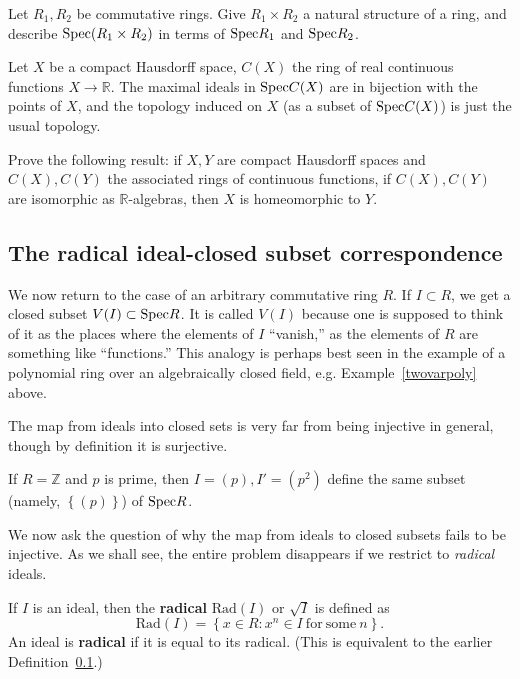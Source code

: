 \begin{exercise} 
Let $R_1, R_2$ be commutative rings. Give $R_1 \times R_2$ a natural structure
of a ring, and describe $\mathrm{Spec}( R_1 \times R_2)$ in terms of $\mathrm{Spec} R_1$ and
$\mathrm{Spec} R_2$.
\end{exercise} 


\begin{exercise} 
Let $X$ be a compact Hausdorff space, $C(X)$ the ring of real continuous
functions $X \to \mathbb{R}$. 
The maximal ideals in $\mathrm{Spec} C(X)$ are in bijection with the points of $X$,
and the topology induced on $X $ (as a subset of $\mathrm{Spec} C(X)$) is just the usual topology.
\end{exercise}

\begin{exercise}
Prove the following result: if $X, Y$ are compact Hausdorff spaces and $C(X),
C(Y)$ the associated rings of continuous functions, if $C(X), C(Y)$ are
isomorphic as $\mathbb{R}$-algebras, then $X$ is homeomorphic to $Y$.
\end{exercise} 


\subsection{The radical ideal-closed subset correspondence}

We now return to the case of an arbitrary  commutative ring $R$. If $I \subset R$, we get a closed
subset $V(I) \subset \mathrm{Spec} R$.  It is called $V(I)$ because one is supposed to
think of it as the places where the elements of $I$ ``vanish,'' as the
elements of $R$ are something like ``functions.'' This analogy is perhaps best
seen in the example of a polynomial ring over an algebraically closed field,
e.g. Example~\ref{twovarpoly} above.

The map from ideals into closed sets is very far from being injective in
general, though by definition it is surjective.

\begin{example} 
If $R = \mathbb{Z}$ and $p$ is prime, then $I = (p), I' = (p^2)$ define the
same subset (namely, $\left\{(p)\right\}$) of
$\mathrm{Spec} R$. 
\end{example} 

We now ask the question of why the map from ideals to closed subsets fails to
be injective. As we shall see, the entire problem disappears if we restrict to
\emph{radical} ideals.

\renewcommand{\rad}{\mathrm{Rad}}
\begin{definition} 
If $I$ is an ideal, then the \textbf{radical} $\rad(I)  $ or $ \sqrt{I}$ is
defined as $$\rad(I) =
\left\{x \in R: x^n \in I \ \mathrm{for} \ \mathrm{some} \ n \right\}.$$
An ideal is \textbf{radical} if it is equal to its radical. (This is
equivalent to the earlier Definition~\ref{}.) 
\end{definition} 

